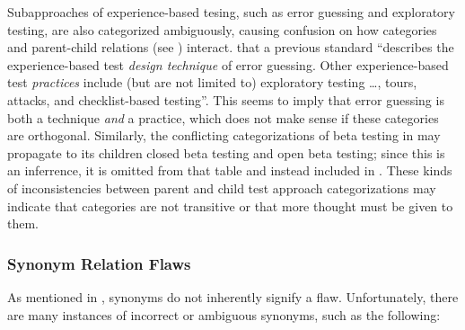 Subapproaches of experience-based tesing, such as error guessing and
exploratory testing, are also categorized ambiguously, causing confusion on how
categories and parent-child relations (see ) interact.
 \citet[p.~34\ifnotpaper, emphasis added\fi]{IEEE2022}
 that a previous standard \citeyearpar{IEEE2021}
``describes the experience-based test \emph{design technique} of error
guessing. Other experience-based test \emph{practices} include (but are not
limited to) exploratory testing \dots, tours, attacks, and checklist-based
testing''. This seems to imply that error guessing is both a technique
\emph{and} a practice, which does not make sense if these categories are
orthogonal. \ifnotpaper Similarly, the conflicting categorizations of beta
    testing in  may propagate to its children closed beta
    testing and open beta testing; since this is an inferrence, it is omitted
    from that table and instead included in . \fi These
kinds of inconsistencies between parent and child test approach categorizations
may indicate that categories are not transitive or that more thought must be
given to them.

\ifnotpaper
    \begin{landscape}
        
    \end{landscape}
\else %
\fi

\subsubsection{Synonym Relation Flaws}\label{syns}

As mentioned in , synonyms do not inherently signify a
flaw. Unfortunately, there are many instances of incorrect or ambiguous
synonyms, such as the following:



